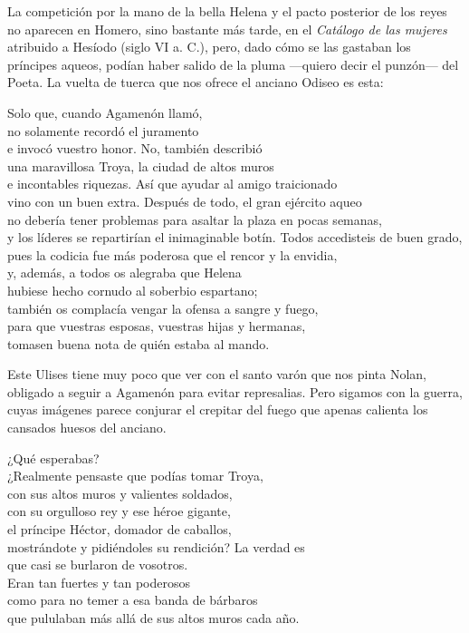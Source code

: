 La competición por la mano de la bella Helena y el pacto posterior de los reyes no aparecen en Homero, sino bastante más tarde, en el \emph{Catálogo de las mujeres} atribuido a Hesíodo (siglo VI a. C.), pero, dado cómo se las gastaban los príncipes aqueos, podían haber salido de la pluma ---quiero decir el punzón--- del Poeta. La vuelta de tuerca que nos ofrece el anciano Odiseo es esta:

\begin{versopropio}
Solo que, cuando Agamenón llamó,\\
no solamente recordó el juramento\\
e invocó vuestro honor. No, también describió\\
una maravillosa Troya, la ciudad de altos muros\\
e incontables riquezas. Así que ayudar al amigo traicionado\\
vino con un buen extra. Después de todo, el gran ejército aqueo\\
no debería tener problemas para asaltar la plaza en pocas semanas,\\
y los líderes se repartirían el inimaginable botín.
\stanzabreak
Todos accedisteis de buen grado,\\
pues la codicia fue más poderosa que el rencor y la envidia,\\
y, además, a todos os alegraba que Helena\\
hubiese hecho cornudo al soberbio espartano;\\
también os complacía vengar la ofensa a sangre y fuego,\\
para que vuestras esposas, vuestras hijas y hermanas,\\
tomasen buena nota de quién estaba al mando.
\end{versopropio}

Este Ulises tiene muy poco que ver con el santo varón que nos pinta Nolan, obligado a seguir a Agamenón para evitar represalias. Pero sigamos con la guerra, cuyas imágenes parece conjurar el crepitar del fuego que apenas calienta los cansados huesos del anciano.

\begin{versopropio}
¿Qué esperabas?\\
¿Realmente pensaste que podías tomar Troya,\\
con sus altos muros y valientes soldados,\\
con su orgulloso rey y ese héroe gigante,\\
el príncipe Héctor, domador de caballos,\\
mostrándote y pidiéndoles su rendición?
\stanzabreak
La verdad es\\
que casi se burlaron de vosotros.\\
Eran tan fuertes y tan poderosos\\
como para no temer a esa banda de bárbaros\\
que pululaban más allá de sus altos muros cada año.
\end{versopropio}

